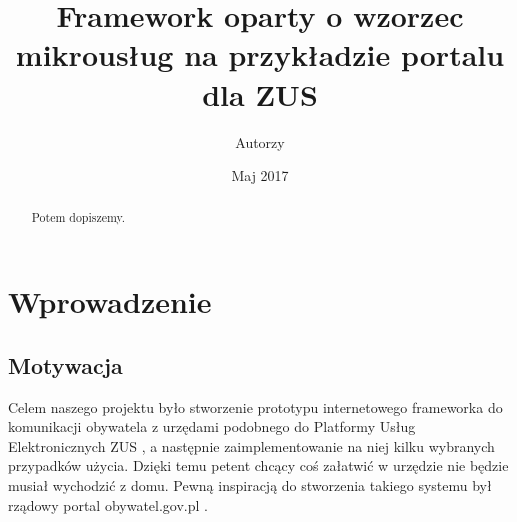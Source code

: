 \documentclass[licencjacka]{pracamgr}
\author{Autorzy}
\title{Framework oparty o wzorzec mikrousług na przykładzie portalu dla ZUS}
\date{Maj 2017}
\begin{document}
\maketitle

\begin{abstract}
  Potem dopiszemy.
\end{abstract}

\tableofcontents



\chapter{Wprowadzenie}\label{r:wstep}

\section{Motywacja}

Celem naszego projektu było stworzenie prototypu internetowego frameworka do komunikacji obywatela z urzędami
podobnego do Platformy Usług Elektronicznych ZUS \cite{zuspue}, a następnie zaimplementowanie na niej kilku wybranych przypadków użycia. Dzięki temu petent chcący
coś załatwić w urzędzie nie będzie musiał wychodzić z domu. Pewną inspiracją do stworzenia takiego systemu był
rządowy portal obywatel.gov.pl \cite{mcobywatel}.
\end{document}
